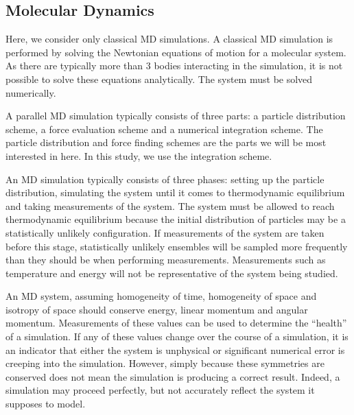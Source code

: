 %
%
\subsection{Molecular Dynamics}


Here, we consider only classical MD simulations.
%
A classical MD simulation is performed by
solving the Newtonian equations of motion for
a molecular system.
%
As there are typically more than 3 bodies interacting in the simulation,
it is not possible to solve these equations analytically.
%
The system must be solved numerically.


%
A parallel MD simulation typically consists of three parts:
a particle distribution scheme,
a force evaluation scheme and
a numerical integration scheme.
%
The particle distribution and force finding schemes are
the parts we will be most interested in here.
%
In this study, we use the \velocityverlet{} integration scheme.


%
An MD simulation typically consists of three phases:
setting up the particle distribution,
simulating the system until it comes to thermodynamic equilibrium and
taking measurements of the system.
%
The system must be allowed to reach thermodynamic equilibrium because
the initial distribution of particles may be a statistically unlikely
configuration.
%
If measurements of the system are taken before this stage, statistically
unlikely ensembles will be sampled more frequently than they should be when
performing measurements.
%
Measurements such as temperature and energy will not be representative
of the system being studied.



%
An MD system,
assuming homogeneity of time,
homogeneity of space and
isotropy of space
should conserve energy, linear momentum and angular momentum.
%
Measurements of these values can be used to
determine the ``health'' of a simulation.
%
If any of these values change over the course of a simulation,
it is an indicator that either the system is unphysical or
significant numerical error is creeping into the simulation.
%
However, simply because these symmetries are conserved does not mean
the simulation is producing a correct result.
%
Indeed, a simulation may proceed perfectly, but not accurately reflect
the system it supposes to model.




